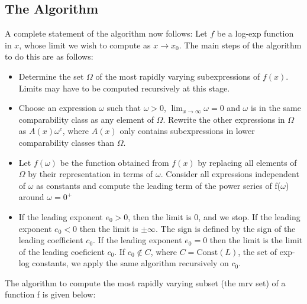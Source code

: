 \subsection{The Algorithm}
A complete statement of the algorithm now follows:
Let $f$ be a log-exp function in $x$, whose limit we wish to compute as $x\rightarrow x_0.$ The main steps of the algorithm to do this are as follows:
\begin{itemize}
\item{Determine the set $\Omega$ of the most rapidly varying subexpressions of $f(x)$. Limits may have to be computed recursively at this stage.}
\item{Choose an expression $\omega$ such that $\omega>0$, $\lim_{x \rightarrow \infty} \omega=0 $ and $\omega$ is in the same comparability class as any element of $\Omega$. Rewrite the other expressions in $\Omega$ as $A(x)\omega^{c}$, where $A(x)$ only contains subexpressions in lower comparability classes than $\Omega$.}
\item{Let $f(\omega)$ be the function obtained from $f(x)$ by replacing all elements of $\Omega $ by their representation in terms of $\omega$. Consider all expressions independent of $\omega$ as constants and compute the leading term of the power series of f($\omega$) around $\omega=0^{+}$ }
\item{If the leading exponent $e_0>0$, then the limit is 0, and we stop. If the leading exponent $e_0<0$ then the limit is $\pm \infty$. The sign is defined by the sign of the leading coefficient $c_0$. If the leading exponent $e_0=0$ then the limit is the limit of the leading coeficient $c_0$. If $c_0\not \in C$, where $C=\text{Const}(L)$, the set of exp-log constants, we apply the same algorithm recursively on $c_0$.}
\end{itemize}
The algorithm to compute the most rapidly varying subset (the mrv set) of a function f is given below:

